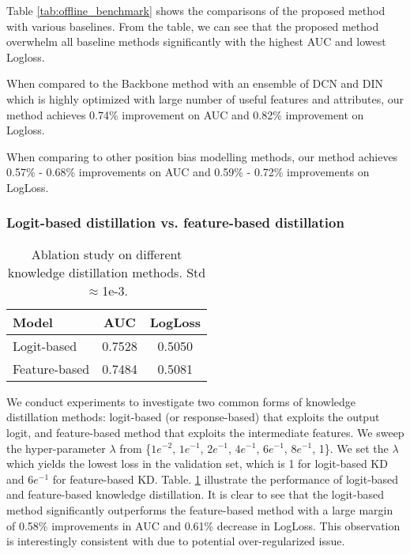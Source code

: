 \documentclass[sigconf,natbib=true,anonymous=false]{acmart}
\begin{document}
Table \ref{tab:offline_benchmark} shows the comparisons of the proposed method with various baselines.
From the table, we can see that the proposed method overwhelm all baseline methods significantly with the highest AUC and lowest Logloss.

When compared to the Backbone method with an ensemble of DCN and DIN which is highly optimized with large number of useful features and attributes, our method achieves 0.74\% improvement on AUC and 0.82\% improvement on Logloss.

When comparing to other position bias modelling methods, our method achieves 0.57\% - 0.68\% improvements on AUC and 0.59\% - 0.72\% improvements on LogLoss.

\subsubsection{Logit-based distillation vs. feature-based distillation}
\begin{table}[]
\centering
\caption{Ablation study on different knowledge distillation methods. Std$\approx$1e-3. }
\label{tab:kd_ablation}
\begin{tabular}{lcc}
\hline
Model               & AUC       & LogLoss \\ \hline
Logit-based         & 0.7528      & 0.5050    \\
Feature-based       & 0.7484      & 0.5081    \\ \hline
\end{tabular}
\end{table}

We conduct experiments to investigate two common forms of knowledge distillation methods: logit-based (or response-based) that exploits the output logit, and feature-based method \cite{gou2021knowledge} that exploits the intermediate features.
We sweep the hyper-parameter $\lambda$ from \{$1e^{-2}$, $1e^{-1}$, $2e^{-1}$, $4e^{-1}$, $6e^{-1}$, $8e^{-1}$, 1\}.
We set the $\lambda$ which yields the lowest loss in the validation set, which is 1 for logit-based KD and $6e^{-1}$ for feature-based KD.  
Table. \ref{tab:kd_ablation} illustrate the performance of logit-based and feature-based knowledge distillation.
It is clear to see that the logit-based method significantly outperforms the feature-based method with a large margin of 0.58\% improvements in AUC and 0.61\% decrease in LogLoss. 
This observation is interestingly consistent with \cite{duong2019shrinkteanet,romero2014fitnets} due to potential over-regularized issue.
\end{document}
